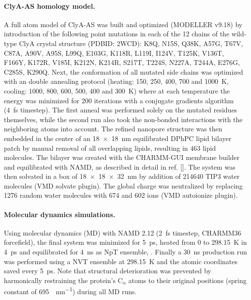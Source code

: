 \documentclass[journal=ancac3,manuscript=article,etalmode=truncate,maxauthors=0,layout=onecolumn]{achemso}
\begin{document}
\paragraph{ClyA-AS homology model.}
%
A full atom model of ClyA-AS\cite{Soskine-2013} was built and optimized (MODELLER v9.18\cite{Sali-1993}) by
introduction of the following point mutations in each of the 12 chains of the wild-type ClyA crystal structure
(PDBID: 2WCD\cite{Mueller-2009}): K8Q, N15S, Q38K, A57G, T67V, C87A, A90V, A95S, L99Q, E103G, K118R, L119I,
I124V, T125K, V136T, F166Y, K172R, V185I, K212N, K214R, S217T, T224S, N227A, T244A, E276G, C285S, K290Q. Next,
the conformation of all mutated side chains was optimized with an double annealing protocol (heating: 150,
250, 400, 700 and \SI{1000}{\kelvin}, cooling: 1000, 800, 600, 500, 400 and \SI{300}{\kelvin}) where at each
temperature the energy was minimized for 200 iterations with a conjugate gradients algorithm (\SI{4}{\fs}
timestep).\cite{Shanno-1980} The first anneal was performed solely on the mutated residues themselves, while
the second run also took the non-bonded interactions with the neighboring atoms into account. The refined
nanopore structure was then embedded in the center of an \SI{18x18}{\nm} equilibrated DPhPC lipid bilayer
patch by manual removal of all overlapping lipids, resulting in 463 lipid molecules. The bilayer was created
with the CHARMM-GUI\cite{Jo-2008} membrane builder\cite{Lee-2016} and equilibrated with
NAMD\cite{Phillips-2005}, as described in detail in ref. []. The system was then solvated in
a box of \SI{18x18x32}{\nm} by addition of 214640 TIP3 water molecules (VMD solvate plugin). The global charge
was neutralized by replacing 1276 random water molecules with 674 \Na{} and 602 \Cl{} ions (VMD autoionize
plugin).\cite{Humphrey-1996}

\paragraph{Molecular dynamics simulations.}
%
Using molecular dynamics (MD) with NAMD 2.12 (\SI{2}{\fs} timestep, CHARMM36 forcefield\cite{Best-2012}), the
final system was minimized for \SI{5}{\ps}, heated from 0 to \SI{298.15}{\kelvin} in \SI{4}{\ps} and
equilibrated for \SI{4}{\ns} as NpT ensemble, .\cite{Aksimentiev-2005} Finally a \SI{30}{\ns} production run
was performed using a NVT ensemble at \SI{298.15}{\kelvin} and the atomic coordinates saved every \SI{5}{\ps}.
Note that structural deterioration was prevented by harmonically restraining the protein's C$_\alpha$ atoms to
their original positions (spring constant of \SI{695}{\pN\per\nm}) during all MD runs.\cite{Bhattacharya-2011}
\end{document}
